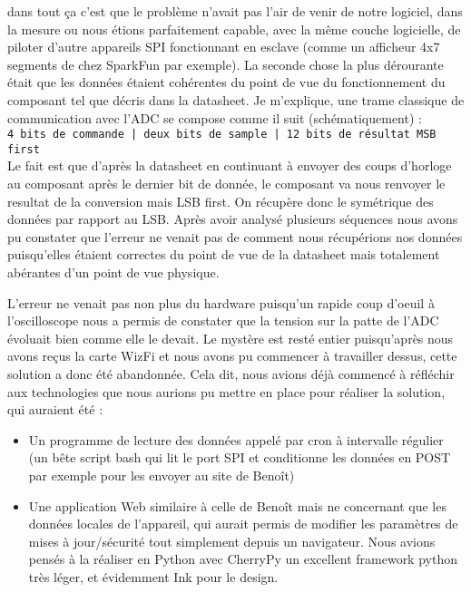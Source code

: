 		dans tout ça c'est que le problème n'avait pas l'air de venir de notre logiciel,
		dans la mesure ou nous étions parfaitement capable, avec la même couche logicielle,
		de piloter d'autre appareils SPI fonctionnant en esclave (comme un afficheur 4x7
		segments de chez SparkFun par exemple). La seconde chose la plus dérourante était
		que les données étaient cohérentes du point de vue du fonctionnement du composant
		tel que décris dans la datasheet. Je m'explique, une trame classique de communication avec
		l'ADC se compose comme il suit (schématiquement) :
		\\
		\texttt{4 bits de commande | deux bits de sample | 12 bits de résultat MSB first}\\

		Le fait est que d'après la datasheet en continuant à envoyer des coups d'horloge
		au composant après le dernier bit de donnée, le composant va nous renvoyer le
		resultat de la conversion mais LSB first. On récupère donc le symétrique des données
		par rapport au LSB. Après avoir analysé plusieurs séquences nous avons pu constater que
		l'erreur ne venait pas de comment nous récupérions nos données puisqu'elles étaient
		correctes du point de vue de la datasheet mais totalement abérantes d'un point de vue physique.
		\par
		L'erreur ne venait pas non plus du hardware puisqu'un rapide coup d'oeuil à l'oscilloscope nous a
		permis de constater que la tension sur la patte de l'ADC évoluait bien comme elle le devait.
		Le mystère est resté entier puisqu'après nous avons reçus la carte WizFi et nous avons pu commencer
		à travailler dessus, cette solution a donc été abandonnée. Cela dit, nous avions déjà commencé à
		réfléchir aux technologies que nous aurions pu mettre en place pour réaliser la solution, qui auraient été :
		\begin{itemize}
			\item Un programme de lecture des données appelé par cron à intervalle régulier (un bête script bash
			qui lit le port SPI et conditionne les données en POST par exemple pour les envoyer au site de Benoît)
			\item Une application Web similaire à celle de Benoît mais ne concernant que les données locales
			de l'appareil, qui aurait permis de modifier les paramètres de mises à jour/sécurité tout
			simplement depuis un navigateur. Nous avions pensés à la réaliser en Python avec CherryPy un
			excellent framework python très léger, et évidemment Ink pour le design. 
		\end{itemize}
